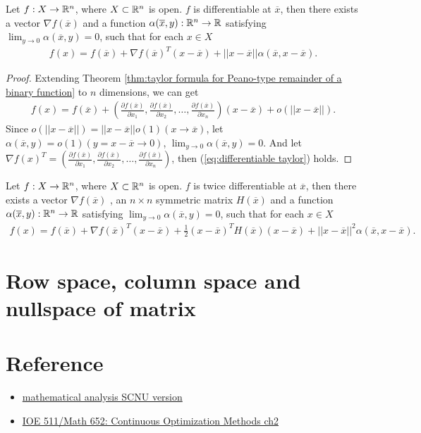 \begin{proposition}{}{}
    Let $f:X\rightarrow \mathbb{R}^n$, where $X\subset \mathbb{R}^n$ is open. 
    $f$ is differentiable at $\overline{x}$, then there exists a vector $\nabla f(\overline{x})$ 
    and a function $\alpha(\overline{x},y):\mathbb{R}^n\rightarrow \mathbb{R}$ satisfying $\lim_{y\rightarrow 0}\alpha(\overline{x},y)=0$, such that for each $x\in X$
    \begin{align}
        f(x) = f(\overline{x}) +\nabla f(\overline{x})^T(x-\overline{x}) + ||x-\overline{x}||\alpha(\overline{x},x-\overline{x}).
        \label{eq:differentiable taylor}
    \end{align} 
\end{proposition}
\begin{proof}
    Extending Theorem \ref{thm:taylor formula for Peano-type remainder of a binary function} to $n$ dimensions,
    we can get 
    \begin{align*}
        f(x) = f(\overline{x}) + (\frac{\partial f(\overline{x})}{\partial x_1},\frac{\partial f(\overline{x})}{\partial x_2},\dots,\frac{\partial f(\overline{x})}{\partial x_n}) (x-\overline{x})+o(||x-\overline{x}||).
    \end{align*}
    Since $o(||x-\overline{x}||)=||x-\overline{x}||o(1)(x\rightarrow \overline{x})$, let $\alpha(\overline{x},y)=o(1)(y=x-\overline{x}\rightarrow 0)$,
    $\lim_{y\rightarrow 0}\alpha(\overline{x},y)=0$. And let $\nabla f(x)^T = (\frac{\partial f(\overline{x})}{\partial x_1},\frac{\partial f(\overline{x})}{\partial x_2},\dots,\frac{\partial f(\overline{x})}{\partial x_n})$, 
    then (\ref{eq:differentiable taylor}) holds.
\end{proof}

\begin{proposition}{}{}
    Let $f:X\rightarrow \mathbb{R}^n$, where $X\subset \mathbb{R}^n$ is open. 
    $f$ is twice differentiable at $\overline{x}$, then there exists a vector $\nabla f(\overline{x})$ 
    , an $n\times n$ symmetric matrix $H(\overline{x})$ and a function $\alpha(\overline{x},y):\mathbb{R}^n\rightarrow \mathbb{R}$ satisfying $\lim_{y\rightarrow 0}\alpha(\overline{x},y)=0$, such that for each $x\in X$
    \begin{align}
        f(x) = f(\overline{x}) +\nabla f(\overline{x})^T(x-\overline{x}) + \frac{1}{2}(x-\overline{x})^TH(\overline{x})(x-\overline{x}) + ||x-\overline{x}||^2\alpha(\overline{x},x-\overline{x}).
        \label{eq:differentiable taylor}
    \end{align} 
\end{proposition}

\section{Row space, column space and nullspace of matrix}


\section{Reference}
\begin{itemize}
    \item \href{}{mathematical analysis SCNU version}
    \item \href{}{IOE 511/Math 652: Continuous Optimization Methods ch2}
\end{itemize}